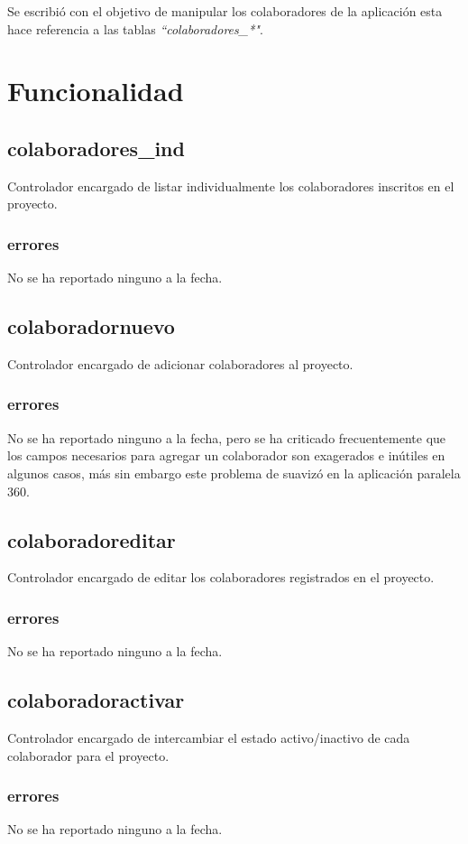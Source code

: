 \documentclass[10pt,a4paper]{book}
\begin{document}
	Se escribió con el objetivo de manipular los colaboradores de la aplicación esta hace referencia a las tablas \textit{``colaboradores\_*"}.

	\section{Funcionalidad}

	\subsection{colaboradores\_ind}
	Controlador encargado de listar individualmente los colaboradores inscritos en el proyecto.
	\subsubsection{errores}
	No se ha reportado ninguno a la fecha.


	\subsection{colaboradornuevo}
	Controlador encargado de adicionar colaboradores al proyecto.
	\subsubsection{errores}
	No se ha reportado ninguno a la fecha, pero se ha criticado frecuentemente que los campos necesarios para agregar un colaborador son exagerados e inútiles en algunos casos, más sin embargo este problema de suavizó en la aplicación paralela 360.

	\subsection{colaboradoreditar}
	Controlador encargado de editar los colaboradores registrados en el proyecto.
	\subsubsection{errores}
	No se ha reportado ninguno a la fecha.

	\subsection{colaboradoractivar}
	Controlador encargado de intercambiar el estado activo/inactivo de cada colaborador para el proyecto.
	\subsubsection{errores}
	No se ha reportado ninguno a la fecha.
\end{document}
